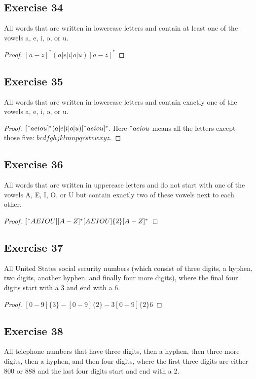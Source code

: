 \documentclass[14pt]{extarticle}
\begin{document}
\subsection{Exercise 34}
All words that are written in lowercase letters and contain at least one of the vowels a, e, i, o, or u.

\begin{proof}
\([a - z]^*(a | e | i | o | u)[a - z]^*\)
\end{proof}

\subsection{Exercise 35}
All words that are written in lowercase letters and contain exactly one of the vowels a, e, i, o, or u.

\begin{proof}
\([\string^ aeiou]^*(a|e|i|o|u)[\string^ aeiou]^*\). Here \(\string^ aeiou\) means  all the letters except those five: 
\(bcdfghjklmnpqrstvwxyz\).
\end{proof}

\subsection{Exercise 36}
All words that are written in uppercase letters and do not start with one of the vowels A, E, I, O, or U but contain 
exactly two of these vowels next to each other.

\begin{proof}
\([\string^ AEIOU][A-Z]^*[AEIOU]\{2\}[A-Z]^*\)
\end{proof}

\subsection{Exercise 37}
All United States social security numbers (which consist of three digits, a hyphen, two digits, another hyphen, and 
finally four more digits), where the final four digits start with a 3 and end with a 6.

\begin{proof}
\([0 - 9]\{3\} - [0 - 9]\{2\} - 3[0 - 9]\{2\}6\)
\end{proof}

\subsection{Exercise 38}
All telephone numbers that have three digits, then a hyphen, then three more digits, then a hyphen, and then four digits, 
where the first three digits are either 800 or 888 and the last four digits start and end with a 2.
\end{document}
